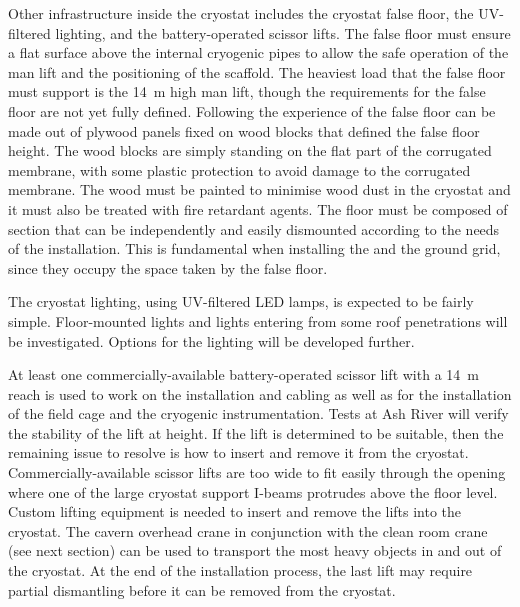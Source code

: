Other infrastructure inside the cryostat includes the cryostat false floor, the UV-filtered lighting, and the battery-operated scissor lifts.
The false floor must ensure a flat surface above the internal cryogenic pipes to allow the safe operation of the man lift and the positioning of the scaffold.
The heaviest load that the false floor must support is the 14~m high man lift, though the requirements for the false floor are not yet fully defined.
Following the experience of  the false floor can be made out of plywood panels fixed on wood blocks that defined the false floor height.
The wood blocks are simply standing on the flat part of the corrugated membrane, with some plastic protection to avoid damage to the corrugated membrane.
The wood must be painted to minimise wood dust in the cryostat and it must also be treated with fire retardant agents.
The floor must be composed of section that can be independently and easily dismounted according to the needs of the installation.
This is fundamental when installing the  and the ground grid, since they occupy the space taken by the false floor.

The cryostat lighting, using UV-filtered LED lamps, is expected to be fairly simple.
Floor-mounted lights and lights entering from some roof penetrations will be investigated.
Options for the lighting will be developed further.

At least one commercially-available battery-operated scissor lift with a 14~m reach is used to work on the  installation and cabling as well as for the installation of the field cage and the cryogenic instrumentation.
Tests at Ash River will verify the stability of the lift at height.
If the lift is determined to be suitable, then the remaining issue to resolve is how to insert and remove it from the cryostat.
Commercially-available scissor lifts are too wide to fit easily through the  opening where one of the large cryostat support I-beams protrudes above the floor level.
Custom lifting equipment is needed to insert and remove the lifts into the cryostat.
The cavern overhead crane in conjunction with the clean room crane (see next section) can be used to transport the most heavy objects in and out of the cryostat.
At the end of the installation process, the last lift may require partial dismantling before it can be removed from the cryostat.

